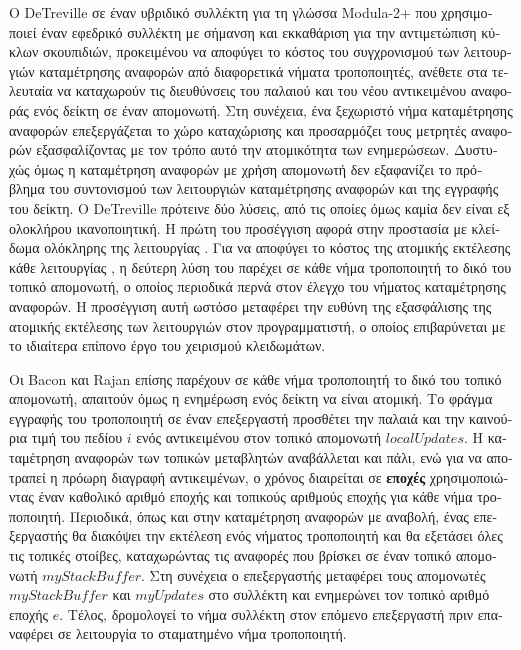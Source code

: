 \begin{greek}
Ο DeTreville \cite{detreville1990experience} σε έναν υβριδικό
συλλέκτη για τη γλώσσα Modula-2+ που χρησιμοποιεί έναν
εφεδρικό συλλέκτη με σήμανση και εκκαθάριση για την
αντιμετώπιση κύκλων σκουπιδιών, προκειμένου να αποφύγει το
κόστος του συγχρονισμού των λειτουργιών καταμέτρησης αναφορών
από διαφορετικά νήματα τροποποιητές, ανέθετε στα τελευταία
να καταχωρούν τις διευθύνσεις του παλαιού και του νέου
αντικειμένου αναφοράς ενός δείκτη σε έναν απομονωτή. Στη
συνέχεια, ένα ξεχωριστό νήμα καταμέτρησης αναφορών επεξεργάζεται
το χώρο καταχώρισης και προσαρμόζει τους μετρητές αναφορών
εξασφαλίζοντας με τον τρόπο αυτό την ατομικότητα των ενημερώσεων.
Δυστυχώς όμως η καταμέτρηση αναφορών με χρήση απομονωτή δεν
εξαφανίζει το πρόβλημα του συντονισμού των λειτουργιών
καταμέτρησης αναφορών και της εγγραφής του δείκτη. Ο
DeTreville πρότεινε δύο λύσεις, από τις οποίες όμως καμία δεν
είναι εξ ολοκλήρου ικανοποιητική. Η πρώτη του προσέγγιση αφορά
στην προστασία με κλείδωμα ολόκληρης της λειτουργίας
\textenglish{}. Για να αποφύγει το κόστος της ατομικής
εκτέλεσης κάθε λειτουργίας \textenglish{}, η δεύτερη λύση
του παρέχει σε κάθε νήμα τροποποιητή το δικό του τοπικό
απομονωτή, ο οποίος περιοδικά περνά στον έλεγχο του νήματος
καταμέτρησης αναφορών. Η προσέγγιση αυτή ωστόσο μεταφέρει
την ευθύνη της εξασφάλισης της ατομικής εκτέλεσης των
λειτουργιών \textenglish{} στον προγραμματιστή, ο οποίος
επιβαρύνεται με το ιδιαίτερα επίπονο έργο του χειρισμού
κλειδωμάτων.

Οι Bacon και Rajan \cite{DBLP:conf/ecoop/BaconR01} επίσης
παρέχουν σε κάθε νήμα τροποποιητή το δικό του τοπικό
απομονωτή, απαιτούν όμως η ενημέρωση ενός δείκτη να είναι
ατομική. Το φράγμα εγγραφής του τροποποιητή σε έναν επεξεργαστή
προσθέτει την παλαιά και την καινούρια τιμή του πεδίου $i$ ενός
αντικειμένου στον τοπικό απομονωτή $localUpdates$. Η καταμέτρηση
αναφορών των τοπικών μεταβλητών αναβάλλεται και πάλι, ενώ για
να αποτραπεί η πρόωρη διαγραφή αντικειμένων, ο χρόνος διαιρείται
σε \textbf{εποχές} χρησιμοποιώντας έναν καθολικό αριθμό εποχής
και τοπικούς αριθμούς εποχής για κάθε νήμα τροποποιητή.
Περιοδικά, όπως και στην καταμέτρηση αναφορών με αναβολή,
ένας επεξεργαστής θα διακόψει την εκτέλεση ενός νήματος
τροποποιητή και θα εξετάσει όλες τις τοπικές στοίβες,
καταχωρώντας τις αναφορές που βρίσκει σε έναν τοπικό απομονωτή
$myStackBuffer$. Στη συνέχεια ο επεξεργαστής μεταφέρει τους
απομονωτές $myStackBuffer$ και $myUpdates$ στο συλλέκτη και
ενημερώνει τον τοπικό αριθμό εποχής $e$. Τέλος, δρομολογεί
το νήμα συλλέκτη στον επόμενο επεξεργαστή πριν επαναφέρει
σε λειτουργία το σταματημένο νήμα τροποποιητή.


\end{greek}

